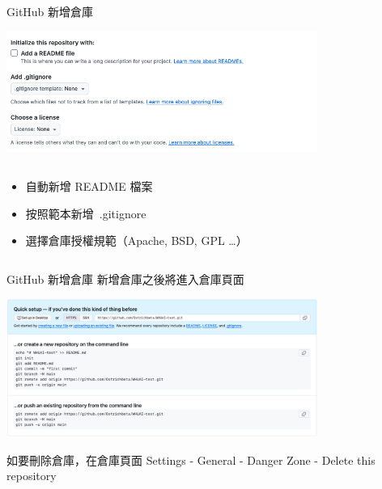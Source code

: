 \documentclass[xetex, unicode, 10pt, aspectratio=169]{beamer}
\begin{document}
\begin{frame}{GitHub 新增倉庫}
    \begin{center}
        \includegraphics[width=4in]{./img/github-create-repo-2.png}
    \end{center}

    \begin{columns}
        \begin{column}{6in}
            \begin{itemize}
                \item {}\quad 自動新增 README 檔案
                \item {}\quad 按照範本新增\ .gitignore
                \item {}\quad 選擇倉庫授權規範（Apache, BSD, GPL \dots ）
            \end{itemize}
        \end{column}
    \end{columns}
\end{frame}

\begin{frame}{GitHub 新增倉庫}
    新增倉庫之後將進入倉庫頁面
    \begin{center}
        \includegraphics[width=4in]{./img/github-new-repo-tips.png}
    \end{center}
    如要刪除倉庫，在倉庫頁面 Settings - General - Danger Zone - Delete this repository
\end{frame}
\end{document}
